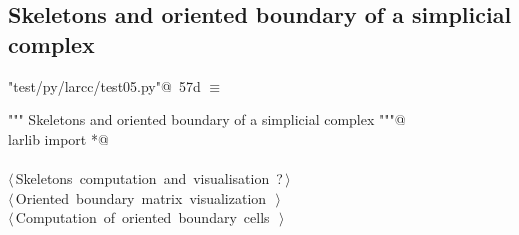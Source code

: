 \documentclass[11pt,oneside]{article}    %
\begin{document}
\subsection{Skeletons and oriented boundary of a simplicial complex}


\begin{flushleft} \small
\begin{minipage}{\linewidth} \label{scrap108}
\protect{}\verb@"test/py/larcc/test05.py"@\nobreak\ {\footnotesize 57d }$\equiv$
\vspace{-1ex}
\begin{list}{}{} \item
\mbox{}\verb@""" Skeletons and oriented boundary of a simplicial complex """@\\
\mbox{}\verb@from larlib import *@\\
\mbox{}\verb@@\\
\mbox{}\verb@@\hbox{$\langle\,$Skeletons computation and visualisation\nobreak\ {\footnotesize ?}$\,\rangle$}\verb@@\\
\mbox{}\verb@@\hbox{$\langle\,$Oriented boundary matrix visualization\nobreak\ {\footnotesize {}}$\,\rangle$}\verb@@\\
\mbox{}\verb@@\hbox{$\langle\,$Computation of oriented boundary cells\nobreak\ {\footnotesize {}}$\,\rangle$}\verb@@\\
\mbox{}\verb@@{\NWsep}
\end{list}
\vspace{-2ex}
\end{minipage}\\[4ex]
\end{flushleft}
\end{document}
